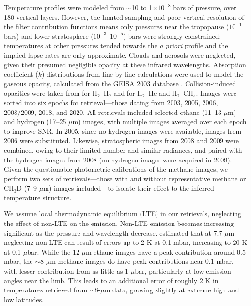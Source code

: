 \documentclass[twocolumn,10pt]{aastex631}
\begin{document}
Temperature profiles were modeled from $\sim$10 to 1$\times 10^{-8}$ bars of pressure, over 180 vertical layers. However, the limited sampling and poor vertical resolution of the filter contribution functions means only pressures near the tropopause ($10^{-1}$ bars) and lower stratosphere ($10^{-3}$--$10^{-5}$) bars were strongly constrained; temperatures at other pressures tended towards the \textit{a priori} profile and the implied lapse rates are only approximate. Clouds and aerosols were neglected, given their presumed negligible opacity at these infrared wavelengths.  Absorption coefficient ($k$) distributions from line-by-line calculations were used to model the gaseous opacity, calculated from the GEISA 2003 database \citep{jacquinet_geisa}. Collision-induced opacities were taken from \citet{fletcher2018hydrogen} for H$_2$--H$_2$ and  \citet{orton2007evidence,borysow1988collison,borysow1989collision} for H$_2$--He and H$_2$--CH$_4$. 
Images were sorted into six epochs for retrieval---those dating from 2003, 2005, 2006, 2008/2009, 2018, and 2020.  All retrievals included selected ethane (11--13 $\mu$m) and hydrogen (17--25 $\mu$m) images, with multiple images averaged over each epoch to improve SNR. In 2005, since no hydrogen images were available, images from 2006 were substituted. Likewise, stratospheric images from 2008 and 2009 were combined, owing to their limited number and similar radiances, and paired with the hydrogen images from 2008 (no hydrogen images were acquired in 2009).  Given the questionable photometric calibrations of the methane images, we perform two sets of retrievals---those with and without representative methane or CH$_3$D (7--9 $\mu$m) images included---to isolate their effect to the inferred temperature structure.  

We assume local thermodynamic equilibrium (LTE) in our retrievals, neglecting the effect of non-LTE on the emission. Non-LTE emission becomes increasing significant as the pressure and wavelength decrease. \citet{appleby1990ch4} estimated that at 7.7 $\mu$m, neglecting non-LTE can result of errors up to 2 K at 0.1 mbar, increasing to 20 K at 0.1 $\mu$bar. While the 12-$\mu$m ethane images have a peak contribution around 0.5 mbar, the $\sim$8-$\mu$m methane images do have peak contributions near 0.1 mbar, with lesser contribution from as little as 1 $\mu$bar, particularly at low emission angles near the limb. This leads to an additional error of roughly 2 K in temperatures retrieved from $\sim$8-$\mu$m data, growing slightly at extreme high and low latitudes. 
\end{document}

